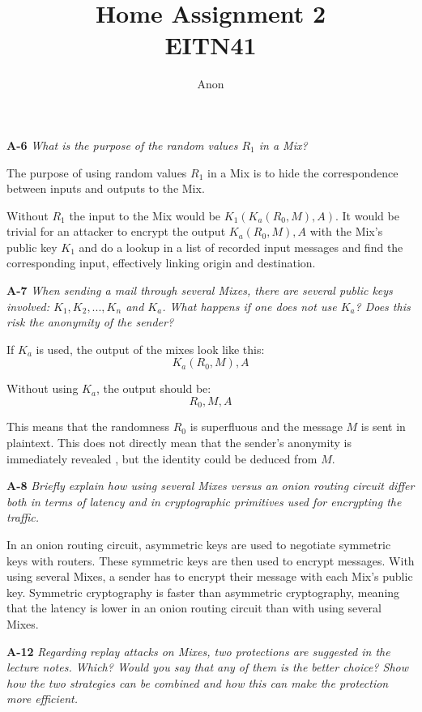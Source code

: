 \documentclass[a4paper]{article}
\title{Home Assignment 2 \\ EITN41}
\author{Anon}
\date{}
\newcommand{\Q}[2]{ \vspace{10pt} \textbf{#1} \textit{#2} }
\newcommand{\A}[1]{ #1 }
\begin{document}
\maketitle

\Q{A-6} { %
  What is the purpose of the random values $R_1$ in a Mix?
}

\A{
  The purpose of using random values $R_1$ in a Mix is
  to hide the correspondence between inputs and outputs to the Mix.

  Without $R_1$ the input to the Mix would be
  $K_1(K_a(R_0,M),A)$. It would be trivial for an attacker to encrypt
  the output $K_a(R_0,M),A$ with the Mix's public key $K_1$
  and do a lookup in a list of recorded input messages 
  and find the corresponding input, effectively linking
  origin and destination.
}

\Q{A-7} { %
  When sending a mail through several Mixes, there are several public keys 
  involved: $K_1,K_2, . . . ,K_n$ and $K_a$. 
  What happens if one does not use $K_a$? 
  Does this risk the anonymity of the sender?
}

\A{
  If $K_a$ is used, the output of the mixes look like this:
  \begin{displaymath}
    K_a(R_0,M),A
  \end{displaymath}

  Without using $K_a$, the output should be:
  \begin{displaymath}
    R_0,M,A
  \end{displaymath}

  This means that the randomness $R_0$ is superfluous 
  and the message $M$ is sent in plaintext. This does not
  directly mean that the sender's anonymity is immediately revealed
  , but the identity could be deduced from $M$.
}

\Q{A-8} {
 Briefly explain how using several Mixes versus an onion routing 
 circuit differ both in terms of latency and in cryptographic 
 primitives used for encrypting the traffic. 
}

\A{
  In an onion routing circuit, asymmetric keys are used to negotiate symmetric
  keys with routers. These symmetric keys are then used to encrypt messages. 
  With using several Mixes, a sender has to encrypt their
  message with each Mix's public key. 
  Symmetric cryptography is faster than asymmetric cryptography,
  meaning that the latency is lower in an onion routing circuit than
  with using several Mixes.
}

\Q{A-12} {
  Regarding replay attacks on Mixes, two protections are suggested in the lecture notes. 
  Which? Would you say that any of them is the better choice?
  Show how the two strategies can be combined and how this
  can make the protection more efficient.
}
\end{document}

